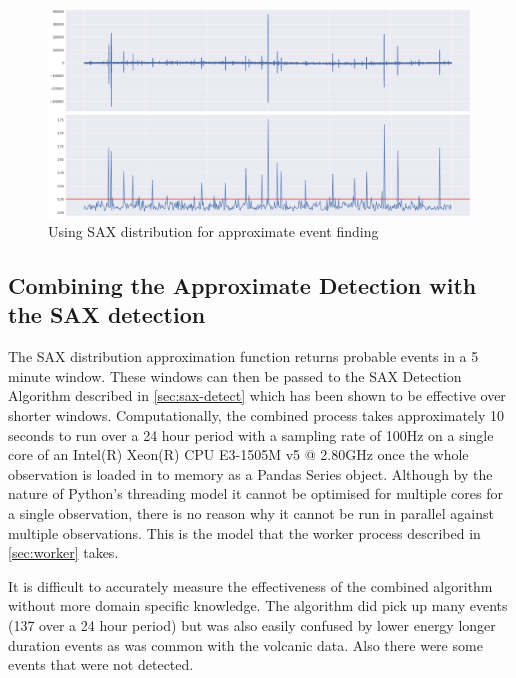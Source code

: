 \documentclass[../report.tex]{subfiles}
\begin{document}
\begin{figure}[H]
	\centering
	\includegraphics[width=1\linewidth]{img/dist_test}
	\caption{Using SAX distribution for approximate event finding}
	\label{fig:disttest}
\end{figure}

\subsection{Combining the Approximate Detection with the SAX detection} \label{sec:sax-combined}

	The SAX distribution approximation function returns probable events in a 5 minute window.  These windows can then be passed to the SAX Detection Algorithm described in \cref{sec:sax-detect} which has been shown to be effective over shorter windows.  Computationally, the combined process takes approximately 10 seconds to run over a 24 hour period with a sampling rate of 100Hz on a single core of an Intel(R) Xeon(R) CPU E3-1505M v5 @ 2.80GHz once the whole observation is loaded in to memory as a Pandas Series object.  Although by the nature of Python's threading model it cannot be optimised for multiple cores for a single observation, there is no reason why it cannot be run in parallel against multiple observations.  This is the model that the worker process described in \cref{sec:worker} takes.

	It is difficult to accurately measure the effectiveness of the combined algorithm without more domain specific knowledge.  The algorithm did pick up many events (137 over a 24 hour period) but was also easily confused by lower energy longer duration events as was common with the volcanic data.  Also there were some events that were not detected.
	
\end{document}

